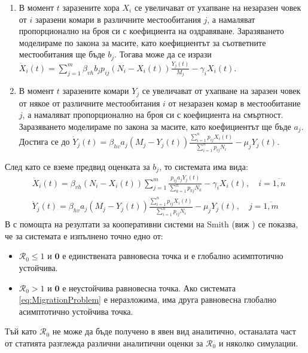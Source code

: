 \begin{enumerate}
  \item В момент $t$ заразените хора $X_i$ се увеличават от ухапване на незаразен човек от $i$ заразени комари в различните местообитания $j$, а намаляват пропорционално на броя си с коефициента на оздравяване. Заразяването моделираме по закона за масите, като коефициентът за съответните местообитания ще бъде $b_j$. Тогава може да се изрази $\dot{X}_i(t) = \sum_{j=1}^{m} \beta_{vh} b_j p_{ij} (N_i - X_i(t)) \frac{Y_j(t)}{M_j} - \gamma_i X_i(t)$.
  \item В момент $t$ заразените комари $Y_j$ се увеличават от ухапване на заразен човек от някое от различните местообитания $i$ от незаразен комар в местообитание $j$, а намаляват пропорционално на броя си с коефициента на смъртност. Заразяването моделираме по закона за масите, като коефициентът ще бъде $a_j$. Достига се до $\dot{Y}_j(t) = \beta_{hv} a_j (M_j - Y_j(t)) \frac{\sum_{i=1}^n p_{ij} X_i(t)}{\sum_{i=1}^n p_{ij} N_i} - \mu_j Y_j(t)$.
\end{enumerate}
След като се вземе предвид оценката за $b_j$, то системата има вида:
\begin{equation}
  \label{eq:MigrationProblem}
  \begin{split}
    &\dot{X}_i(t) = \beta_{vh} (N_i - X_i(t)) \sum_{j=1}^{m} \frac{p_{ij} a_j Y_j(t)}{\sum_{k=1}^n p_{kj} N_k} - \gamma_i X_i(t), \quad i=\overline{1, n} \\
    &\dot{Y}_j(t) = \beta_{hv} a_j (M_j - Y_j(t)) \frac{\sum_{i=1}^n p_{ij} X_i(t)}{\sum_{i=1}^n p_{ij} N_i} - \mu_j Y_j(t), \quad j=\overline{1, m}
  \end{split}
\end{equation}
В \cite{Bichara2016} с помощта на резултати за кооперативни системи на Smith (виж \cite{Smith1986}) се показва, че за системата е изпълнено точно едно от:
\begin{itemize}
  \item $\mathscr{R}_0 \leq 1$ и $\mathbf{0}$ е единствената равновесна точка и е глобално асимптотично устойчива.
  \item $\mathscr{R}_0 > 1$ и $\mathbf{0}$ е неустойчива равновесна точка. Ако системата \eqref{eq:MigrationProblem} е неразложима, има друга равновесна глобално асимптотично устойчива точка.
\end{itemize}

Тъй като $\mathscr{R}_0$ не може да бъде получено в явен вид аналитично, останалата част от статията \cite{Bichara2016} разглежда различни аналитични оценки за $\mathscr{R}_0$ и няколко симулации.

